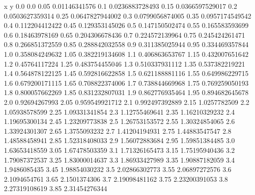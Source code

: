               x                y
            0.0              0.0
           0.05    0.01146341576
            0.1  0.0236883728493
           0.15  0.0366597529017
            0.2  0.0503627359314
           0.25  0.0647827944002
            0.3  0.0799056874005
           0.35  0.0957174549542
            0.4   0.112204412422
           0.45   0.129353145026
            0.5   0.147150502474
           0.55   0.165583593699
            0.6    0.18463978169
           0.65   0.204306678436
            0.7   0.224572139964
           0.75   0.245424261471
            0.8   0.266851372559
           0.85   0.288842032558
            0.9   0.311385025944
           0.95   0.334469357844
            1.0   0.358084249632
           1.05   0.382219134608
            1.1   0.406863653767
           1.15   0.432007651642
            1.2    0.45764117224
           1.25   0.483754455046
            1.3   0.510337931112
           1.35   0.537382219221
            1.4   0.564878122125
           1.45   0.592816622858
            1.5   0.621188881116
           1.55   0.649986229715
            1.6   0.679200171115
           1.65   0.708822374006
            1.7   0.738844669968
           1.75   0.769259050193
            1.8   0.800057662269
           1.85   0.831232807031
            1.9   0.862776935464
           1.95   0.894682645678
            2.0    0.92694267993
           2.05   0.959549921712
            2.1   0.992497392889
           2.15     1.0257782509
            2.2    1.05938578599
           2.25    1.09331341854
            2.3    1.12755469641
           2.35    1.16210329232
            2.4    1.19695300134
           2.45    1.23209773838
            2.5    1.26753153572
           2.55    1.30324854065
            2.6    1.33924301307
           2.65     1.3755093232
            2.7    1.41204194931
           2.75    1.44883547547
            2.8    1.48588458941
           2.85    1.52318408033
            2.9    1.56072883684
           2.95    1.59851384485
            3.0    1.63653418559
           3.05    1.67478503359
            3.1    1.71326165473
           3.15    1.75195940436
            3.2    1.79087372537
           3.25    1.83000014637
            3.3    1.86933427989
           3.35    1.90887182059
            3.4     1.9486085435
           3.45    1.98854030232
            3.5    2.02866302773
           3.55    2.06897272576
            3.6     2.1094654761
           3.65     2.1501374306
            3.7    2.19098481162
           3.75    2.23200391053
            3.8    2.27319108619
           3.85    2.31454276344
